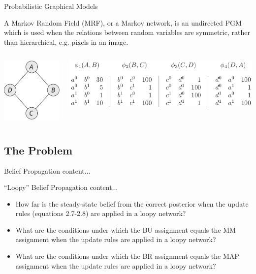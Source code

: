 \documentclass{beamer}
\begin{document}
\begin{frame}{Probabilistic Graphical Models}
    \pause
    \begin{definition}
        A Markov Random Field (MRF), or a Markov network, is an undirected PGM which is used when the relations between
        random variables are symmetric, rather than hierarchical, e.g. pixels in an image.
    \end{definition}
    \pause
    \begin{columns}
        \begin{column}[t]{0.2 \textwidth}
            \includegraphics[scale=0.4]{mrf1}
        \end{column}
        \begin{column}[t]{0.8 \textwidth}
            \includegraphics[scale=0.4]{mrf2}
        \end{column}
    \end{columns}
\end{frame}
\subsection{The Problem}
\begin{frame}{Belief Propagation}
    content...
\end{frame}
\begin{frame}{``Loopy'' Belief Propagation}
    content...
\end{frame}
\begin{frame}
    \begin{itemize}
        \item How far is the steady-state belief from the correct posterior when the update rules (equations 2.7-2.8) are applied in a loopy network?
        \item What are the conditions under which the BU assignment equals the MM assignment when the update rules are applied in a loopy network?
        \item What are the conditions under which the BR assignment equals the MAP assignment when the update rules are applied in a loopy network?
    \end{itemize}
\end{frame}
\end{document}
